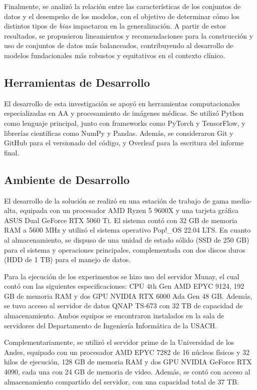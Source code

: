 Finalmente, se analizó la relación entre las características de los conjuntos de datos y el desempeño de los modelos, con el objetivo de determinar cómo los distintos tipos de \textit{bias} impactaron en la generalización. A partir de estos resultados, se propusieron lineamientos y recomendaciones para la construcción y uso de conjuntos de datos más balanceados, contribuyendo al desarrollo de modelos fundacionales más robustos y equitativos en el contexto clínico.

\subsection{Herramientas de Desarrollo}

El desarrollo de esta investigación se apoyó en herramientas computacionales especializadas en \gls{AA} y procesamiento de imágenes médicas. Se utilizó Python como lenguaje principal, junto con frameworks como PyTorch y TensorFlow, y librerías científicas como NumPy y Pandas. Además, se consideraron Git y GitHub para el versionado del código, y Overleaf para la escritura del informe final.

\subsection{Ambiente de Desarrollo}

El desarrollo de la solución se realizó en una estación de trabajo de gama media-alta, equipada con un procesador AMD Ryzen 5 9600X y una tarjeta gráfica ASUS Dual GeForce RTX 5060 Ti. El sistema contó con 32 GB de memoria RAM a 5600 MHz y utilizó el sistema operativo Pop!\_OS 22.04 LTS. En cuanto al almacenamiento, se dispuso de una unidad de estado sólido (SSD de 250 GB) para el sistema y operaciones principales, complementada con dos discos duros (HDD de 1 TB) para el manejo de datos.

Para la ejecución de los experimentos se hizo uso del servidor Munay, el cual contó con las siguientes especificaciones: CPU 4th Gen AMD EPYC 9124, 192 GB de memoria RAM y dos GPU NVIDIA RTX 6000 Ada Gen 48 GB. Además, se tuvo acceso al servidor de datos QNAP TS-673 con 32 TB de capacidad de almacenamiento. Ambos equipos se encontraron instalados en la sala de servidores del Departamento de Ingeniería Informática de la USACH.

Complementariamente, se utilizó el servidor prime de la Universidad de los Andes, equipado con un procesador AMD EPYC 7282 de 16 núcleos físicos y 32 hilos de ejecución, 128 GB de memoria RAM y dos GPU NVIDIA GeForce RTX 4090, cada una con 24 GB de memoria de video. Además, se contó con acceso al almacenamiento compartido del servidor, con una capacidad total de 37 TB.

